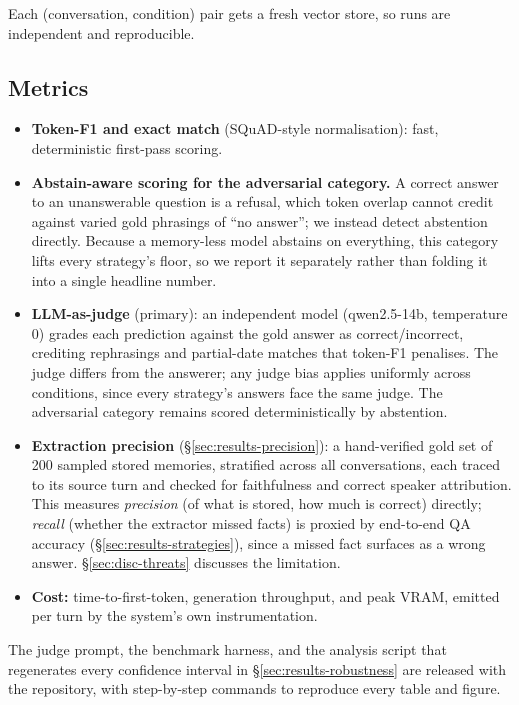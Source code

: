 Each (conversation, condition) pair gets a fresh vector store, so runs are
independent and reproducible.

\subsection{Metrics}
\label{sec:setup-metrics}

\begin{itemize}
  \item \textbf{Token-F1 and exact match} (SQuAD-style normalisation): fast, deterministic
  first-pass scoring.
  \item \textbf{Abstain-aware scoring for the adversarial category.} A correct answer to an
  unanswerable question is a refusal, which token overlap cannot credit against
  varied gold phrasings of ``no answer''; we instead detect abstention directly.
  Because a memory-less model abstains on everything, this category lifts every
  strategy's floor, so we report it separately rather than folding it into a
  single headline number.
  \item \textbf{LLM-as-judge} (primary): an independent model (qwen2.5-14b, temperature 0)
  grades each prediction against the gold answer as correct/incorrect, crediting
  rephrasings and partial-date matches that token-F1 penalises. The judge differs
  from the answerer; any judge bias applies uniformly across conditions, since
  every strategy's answers face the same judge. The adversarial category remains
  scored deterministically by abstention.
  \item \textbf{Extraction precision} (\S\ref{sec:results-precision}): a hand-verified gold
  set of 200 sampled stored memories, stratified across all conversations, each
  traced to its source turn and checked for faithfulness and correct speaker
  attribution. This measures \emph{precision} (of what is stored, how much is
  correct) directly; \emph{recall} (whether the extractor missed facts) is proxied by
  end-to-end QA accuracy (\S\ref{sec:results-strategies}), since a missed fact
  surfaces as a wrong answer. \S\ref{sec:disc-threats} discusses the limitation.
  \item \textbf{Cost:} time-to-first-token, generation throughput, and peak VRAM, emitted
  per turn by the system's own instrumentation.
\end{itemize}

The judge prompt, the benchmark harness, and the analysis script that regenerates
every confidence interval in \S\ref{sec:results-robustness} are released with the
repository, with step-by-step commands to reproduce every table and figure.

